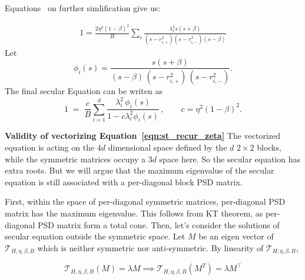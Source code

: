 \documentclass{article}
\begin{document}
Equations~ on further simlification give us:

\begin{align*}
    1 = \frac{2 \eta^2 (1-\beta)^2}{B}\sum_i \frac{\lambda_i^2 s (s+\beta)}{(s - r_{i,+}^2)(s - r_{i,-}^2)(s-\beta)}
\end{align*}
Let
\begin{equation*}
\phi_i(s)
=\frac{s(s+\beta)}{(s-\beta)\,(s-r_{i,+}^2)\,(s-r_{i,-}^2)} .
\end{equation*}
The final secular Equation can be writen as
\begin{equation}
\label{eq:secular-exact}
\qquad
1\;=\;\frac{c}{B}\sum_{i=1}^d
\frac{\lambda_i^2\,\phi_i(s)}{1- c\lambda_i^2 \phi_i(s)}\,,\qquad
c=\eta^2(1-\beta)^2.
\qquad
\end{equation}

\textbf{Validity of vectorizing Equation~\ref{eqn:st_recur_zeta}} The vectorized equation is acting on the $4d$ dimensional space defined by the $d$ $2\times2$ blocks, while the symmetric matrices occupy a $3d$ space here. So the secular equation has extra roots. But we will argue that the maximum eigenvalue of the secular equation is still associated with a per-diagonal block PSD matrix.

First, within the space of per-diagonal symmetric matrices, per-diagonal PSD matrix has the maximum eigenvalue. This follows from KT theorem, as per-diagonal PSD matrix form a total cone. Then, let's consider the solutions of secular equation outside the symmetric space. Let $M$ be an eigen vector of $\mathcal{T}_{H,\eta,\beta,B}$ which is neither symmetric nor anti-symmetric. By linearity of $\mathcal{T}_{H,\eta,\beta,B}$,

\[  \mathcal{T}_{H,\eta,\beta,B}(M) = \lambda M  \implies  \mathcal{T}_{H,\eta,\beta,B}(M^T) =\lambda M^\top\]
\end{document}
